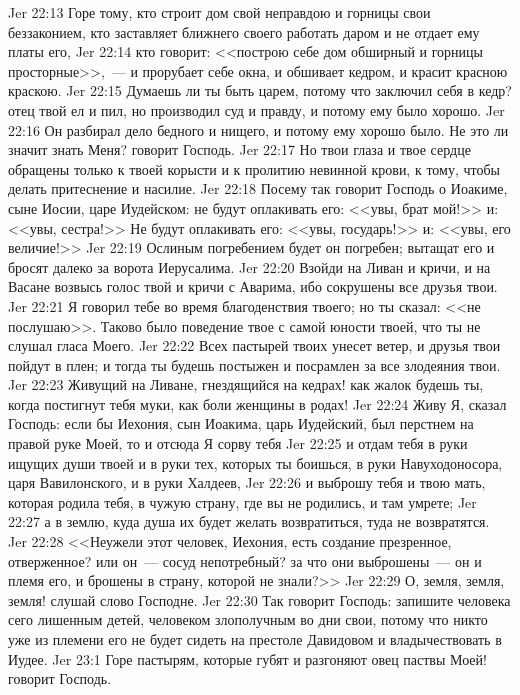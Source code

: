 \vs Jer 22:13 Горе тому, кто строит дом свой неправдою и горницы свои беззаконием, кто заставляет ближнего своего работать даром и не отдает ему платы его,
\vs Jer 22:14 кто говорит: <<построю себе дом обширный и горницы просторные>>,~--- и прорубает себе окна, и обшивает кедром, и красит красною краскою.
\vs Jer 22:15 Думаешь ли ты быть царем, потому что заключил себя в кедр? отец твой ел и пил, но производил суд и правду, и потому ему было хорошо.
\vs Jer 22:16 Он разбирал дело бедного и нищего, и потому ему хорошо было. Не это ли значит знать Меня? говорит Господь.
\vs Jer 22:17 Но твои глаза и твое сердце обращены только к твоей корысти и к пролитию невинной крови, к тому, чтобы делать притеснение и насилие.
\vs Jer 22:18 Посему так говорит Господь о Иоакиме, сыне Иосии, царе Иудейском: не будут оплакивать его: <<увы, брат мой!>> и: <<увы, сестра!>> Не будут оплакивать его: <<увы, государь!>> и: <<увы, его величие!>>
\vs Jer 22:19 Ослиным погребением будет он погребен; вытащат его и бросят далеко за ворота Иерусалима.
\vs Jer 22:20 Взойди на Ливан и кричи, и на Васане возвысь голос твой и кричи с Аварима, ибо сокрушены все друзья твои.
\vs Jer 22:21 Я говорил тебе во время благоденствия твоего; но ты сказал: <<не послушаю>>. Таково было поведение твое с самой юности твоей, что ты не слушал гласа Моего.
\vs Jer 22:22 Всех пастырей твоих унесет ветер, и друзья твои пойдут в плен; и тогда ты будешь постыжен и посрамлен за все злодеяния твои.
\vs Jer 22:23 Живущий на Ливане, гнездящийся на кедрах! как жалок будешь ты, когда постигнут тебя муки, как боли женщины в родах!
\vs Jer 22:24 Живу Я, сказал Господь: если бы Иехония, сын Иоакима, царь Иудейский, был перстнем на правой руке Моей, то и отсюда Я сорву тебя
\vs Jer 22:25 и отдам тебя в руки ищущих души твоей и в руки тех, которых ты боишься, в руки Навуходоносора, царя Вавилонского, и в руки Халдеев,
\vs Jer 22:26 и выброшу тебя и твою мать, которая родила тебя, в чужую страну, где вы не родились, и там умрете;
\vs Jer 22:27 а в землю, куда душа их будет желать возвратиться, туда не возвратятся.
\vs Jer 22:28 <<Неужели этот человек, Иехония, есть создание презренное, отверженное? или он~--- сосуд непотребный? за что они выброшены~--- он и племя его, и брошены в страну, которой не знали?>>
\vs Jer 22:29 О, земля, земля, земля! слушай слово Господне.
\vs Jer 22:30 Так говорит Господь: запишите человека сего лишенным детей, человеком злополучным во дни свои, потому что никто уже из племени его не будет сидеть на престоле Давидовом и владычествовать в Иудее.
\vs Jer 23:1 Горе пастырям, которые губят и разгоняют овец паствы Моей! говорит Господь.

